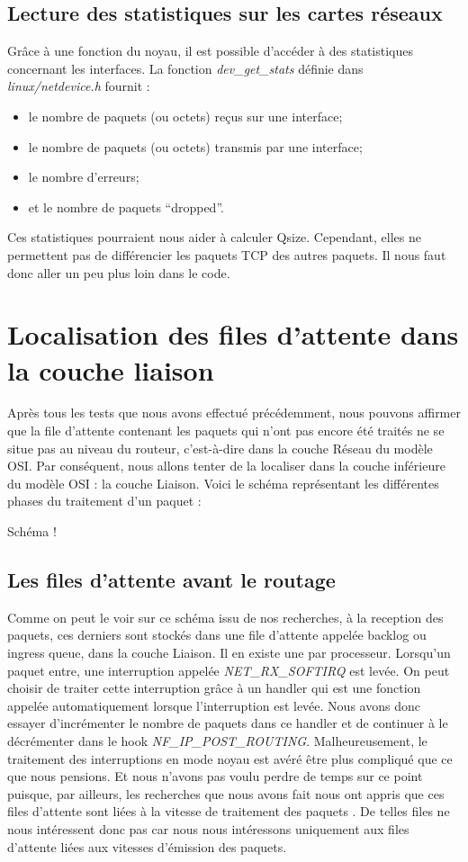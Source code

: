 \documentclass[a4paper]{article}
\begin{document}
\subsection{Lecture des statistiques sur les cartes réseaux}
Grâce à une fonction du noyau, il est possible d’accéder à des
statistiques concernant les interfaces. La fonction \textit{dev\_get\_stats}
définie dans \textit{linux/netdevice.h} fournit :
\begin{itemize}
	\item le nombre de paquets (ou octets) reçus sur une interface;
	\item le nombre de paquets (ou octets) transmis par une interface;
	\item le nombre d’erreurs;
	\item et le nombre de paquets “dropped”.
\end{itemize}

Ces statistiques pourraient nous aider à calculer Qsize. Cependant,
elles ne permettent pas de différencier les paquets TCP des autres paquets.
Il nous faut donc aller un peu plus loin dans le code.

\section{Localisation des files d'attente dans la couche liaison}

Après tous les tests que nous avons effectué précédemment, nous pouvons affirmer
 que la file d'attente contenant les paquets qui n'ont pas encore été traités ne
  se situe pas au niveau du routeur, c'est-à-dire dans la couche Réseau du modèle 
  OSI. Par conséquent, nous allons tenter de la localiser dans la couche
   inférieure du modèle OSI : la couche Liaison. Voici le schéma représentant
    les différentes phases du traitement d'un paquet :

Schéma !

\subsection{Les files d'attente avant le routage}
Comme on peut le voir sur ce schéma issu de nos recherches, à la reception des paquets, ces derniers sont stockés dans une file d'attente appelée backlog \cite{10poin} ou ingress queue, dans la couche Liaison. Il en existe une par processeur. 
Lorsqu'un paquet entre, une interruption appelée \textit{NET\_RX\_SOFTIRQ} est levée. On peut choisir de traiter cette interruption grâce à un handler qui est une fonction appelée automatiquement lorsque l'interruption est levée. Nous avons donc essayer d'incrémenter le nombre de paquets dans ce handler et de continuer à le décrémenter  dans le hook \textit{NF\_IP\_POST\_ROUTING}. Malheureusement, le traitement des interruptions en mode noyau est avéré être plus compliqué que ce que nous pensions. Et nous n'avons pas voulu perdre de temps sur ce point puisque, par ailleurs, les recherches que nous avons fait nous ont appris que ces files d'attente sont liées à la vitesse de traitement des paquets \cite{journey} \cite{bookin}. De telles files ne nous intéressent donc pas car nous nous intéressons uniquement aux files d'attente liées aux vitesses d'émission des paquets. 
\end{document}
